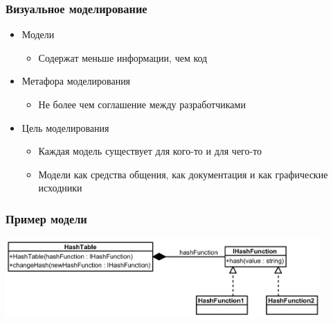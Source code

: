 \documentclass{../../slides-style}
\begin{document}
    \begin{frame}[plain]
        \titlepage
    \end{frame}

    \begin{frame}
        \frametitle{Визуальное моделирование}
        \begin{itemize}
            \item Модели
            \begin{itemize}
                \item Содержат меньше информации, чем код
            \end{itemize}
            \item Метафора моделирования
            \begin{itemize}
                \item Не более чем соглашение между разработчиками
            \end{itemize}
            \item Цель моделирования
            \begin{itemize}
                \item Каждая модель существует для кого-то и для чего-то
                \item Модели как средства общения, как документация и как графические исходники
            \end{itemize}
        \end{itemize}
    \end{frame}

    \begin{frame}
        \frametitle{Пример модели}
        \begin{center}
            \includegraphics[width=0.9\textwidth]{modelExample.png}
        \end{center}
    \end{frame}
\end{document}
